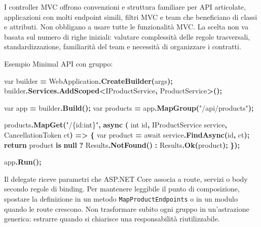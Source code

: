 \documentclass[
  italian,
  10pt,
]{book}
\newenvironment{Shaded}{\begin{snugshade}}{\end{snugshade}}
\newcommand{\DataTypeTok}[1]{\textcolor[rgb]{0.13,0.29,0.53}{#1}}
\newcommand{\FunctionTok}[1]{\textcolor[rgb]{0.13,0.29,0.53}{\textbf{#1}}}
\newcommand{\KeywordTok}[1]{\textcolor[rgb]{0.13,0.29,0.53}{\textbf{#1}}}
\newcommand{\NormalTok}[1]{#1}
\newcommand{\OperatorTok}[1]{\textcolor[rgb]{0.81,0.36,0.00}{\textbf{#1}}}
\newcommand{\StringTok}[1]{\textcolor[rgb]{0.31,0.60,0.02}{#1}}
\begin{document}
I controller MVC offrono convenzioni e struttura familiare per API
articolate, applicazioni con molti endpoint simili, filtri MVC e team
che beneficiano di classi e attributi. Non obbligano a usare tutte le
funzionalità MVC. La scelta non va basata sul numero di righe iniziali:
valutare complessità delle regole trasversali, standardizzazione,
familiarità del team e necessità di organizzare i contratti.

Esempio Minimal API con gruppo:

\begin{Shaded}
\begin{Highlighting}[]
\DataTypeTok{var}\NormalTok{ builder }\OperatorTok{=}\NormalTok{ WebApplication}\OperatorTok{.}\FunctionTok{CreateBuilder}\OperatorTok{(}\NormalTok{args}\OperatorTok{);}
\NormalTok{builder}\OperatorTok{.}\FunctionTok{Services}\OperatorTok{.}\FunctionTok{AddScoped}\OperatorTok{\textless{}}\NormalTok{IProductService}\OperatorTok{,}\NormalTok{ ProductService}\OperatorTok{\textgreater{}();}

\DataTypeTok{var}\NormalTok{ app }\OperatorTok{=}\NormalTok{ builder}\OperatorTok{.}\FunctionTok{Build}\OperatorTok{();}
\DataTypeTok{var}\NormalTok{ products }\OperatorTok{=}\NormalTok{ app}\OperatorTok{.}\FunctionTok{MapGroup}\OperatorTok{(}\StringTok{"/api/products"}\OperatorTok{);}

\NormalTok{products}\OperatorTok{.}\FunctionTok{MapGet}\OperatorTok{(}\StringTok{"/\{id:int\}"}\OperatorTok{,} \FunctionTok{async} \OperatorTok{(}
    \DataTypeTok{int}\NormalTok{ id}\OperatorTok{,}\NormalTok{ IProductService service}\OperatorTok{,}\NormalTok{ CancellationToken ct}\OperatorTok{)} \OperatorTok{=\textgreater{}}
\OperatorTok{\{}
    \DataTypeTok{var}\NormalTok{ product }\OperatorTok{=}\NormalTok{ await service}\OperatorTok{.}\FunctionTok{FindAsync}\OperatorTok{(}\NormalTok{id}\OperatorTok{,}\NormalTok{ ct}\OperatorTok{);}
    \KeywordTok{return}\NormalTok{ product }\KeywordTok{is} \KeywordTok{null} \OperatorTok{?}\NormalTok{ Results}\OperatorTok{.}\FunctionTok{NotFound}\OperatorTok{()} \OperatorTok{:}\NormalTok{ Results}\OperatorTok{.}\FunctionTok{Ok}\OperatorTok{(}\NormalTok{product}\OperatorTok{);}
\OperatorTok{\});}

\NormalTok{app}\OperatorTok{.}\FunctionTok{Run}\OperatorTok{();}
\end{Highlighting}
\end{Shaded}

Il delegate riceve parametri che ASP.NET Core associa a route, servizi o
body secondo regole di binding. Per mantenere leggibile il punto di
composizione, spostare la definizione in un metodo
\texttt{MapProductEndpoints} o in un modulo quando le route crescono.
Non trasformare subito ogni gruppo in un'astrazione generica: estrarre
quando si chiarisce una responsabilità riutilizzabile.
\end{document}
